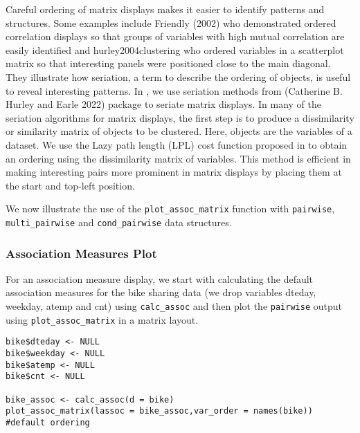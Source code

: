 Careful ordering of matrix displays makes it easier to identify patterns and structures. Some examples include Friendly (2002) who demonstrated ordered correlation displays so that groups of variables with high mutual correlation are easily identified and hurley2004clustering who ordered variables in a scatterplot matrix so that interesting panels were positioned close to the main diagonal. They illustrate how seriation, a term to describe the ordering of objects, is useful to reveal interesting patterns. In , we use seriation methods from  (Catherine B. Hurley and Earle 2022) package to seriate matrix displays. In many of the seriation algorithms for matrix displays, the first step is to produce a dissimilarity or similarity matrix of objects to be clustered. Here, objects are the variables of a dataset. We use the Lazy path length (LPL) cost function proposed in  to obtain an ordering using the dissimilarity matrix of variables. This method is efficient in making interesting pairs more prominent in matrix displays by placing them at the start and top-left position.

We now illustrate the use of the \texttt{plot\_assoc\_matrix} function with \texttt{pairwise}, \texttt{multi\_pairwise} and \texttt{cond\_pairwise} data structures.

\hypertarget{association-measures-plot}{%
\subsubsection{Association Measures Plot}\label{association-measures-plot}}

For an association measure display, we start with calculating the default association measures for the bike sharing data (we drop variables dteday, weekday, atemp and cnt) using \texttt{calc\_assoc} and then plot the \texttt{pairwise} output using \texttt{plot\_assoc\_matrix} in a matrix layout.

\begin{verbatim}
bike$dteday <- NULL 
bike$weekday <- NULL
bike$atemp <- NULL
bike$cnt <- NULL

bike_assoc <- calc_assoc(d = bike)
plot_assoc_matrix(lassoc = bike_assoc,var_order = names(bike)) #default ordering
\end{verbatim}

